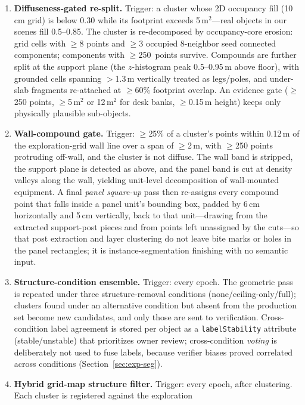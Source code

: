 \documentclass[electronics,article,accept,pdftex,moreauthors]{Definitions/mdpi}
\begin{document}
\begin{enumerate}
\item \textbf{{Diffuseness-gated re-split.}} Trigger: a cluster whose 2D
occupancy fill (10\,cm grid) is below 0.30 while its footprint exceeds
5\,m$^2$---real objects in our scenes fill 0.5--0.85. The cluster is
re-decomposed by occupancy-core erosion: grid cells with $\ge$8 points and
$\ge$3 occupied 8-neighbor seed connected components; components with
$\ge$250~points survive. Compounds are further split at the support plane
(the $z$-histogram peak 0.5--0.95\,m above floor), with grounded cells
spanning $>$1.3\,m vertically treated as legs/poles, and under-slab
fragments re-attached at $\ge$60\% footprint overlap. An evidence gate
($\ge$250 points, $\ge$5\,m$^2$ or 12\,m$^2$ for desk banks,
$\ge$0.15\,m height) keeps only physically plausible sub-objects.
\item \textbf{{Wall-compound gate.}} Trigger: $\ge$25\% of a cluster's
points within 0.12\,m of the exploration-grid wall line over a span of
$\ge$2\,m, with $\ge$250 points protruding off-wall, and the cluster is not
diffuse. The wall band is stripped, the support plane is detected as
above, and the panel band is cut at density valleys along the wall,
yielding unit-level decomposition of wall-mounted equipment. A final
\emph{panel square-up} pass then re-assigns every compound point that
falls inside a panel unit's bounding box, padded by 6\,cm horizontally
and 5\,cm vertically, back to that unit---drawing from the extracted
support-post pieces and from points left unassigned by the cuts---so that
post extraction and layer clustering do not leave bite marks or holes in
the panel rectangles; it is instance-segmentation finishing with no
semantic input.
\item \textbf{{Structure-condition ensemble.}} Trigger: every epoch.
The geometric pass is repeated under three structure-removal conditions
(none/ceiling-only/full); clusters found under an alternative
condition but absent from the production set become new candidates, and
only those are sent to verification. Cross-condition label agreement is
stored per object as a \texttt{labelStability} attribute
(stable/unstable) that prioritizes owner review; cross-condition
\emph{voting} is deliberately not used to fuse labels, because verifier
biases proved correlated across conditions
(Section~\ref{sec:exp-seg}).
\item \textbf{Hybrid grid-map structure filter.} Trigger: every epoch,
after clustering. Each cluster is registered against the exploration

\end{enumerate}
\end{document}
